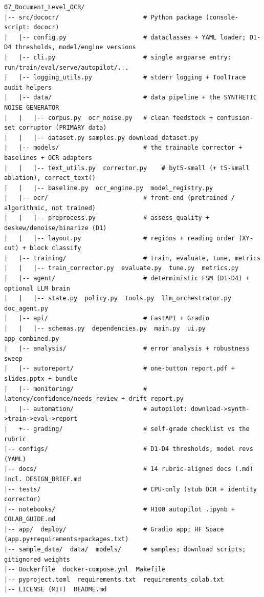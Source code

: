 \documentclass[12pt,a4paper]{article}
\begin{document}
\begin{lstlisting}[basicstyle=\ttfamily\footnotesize]
07_Document_Level_OCR/
|-- src/dococr/                       # Python package (console-script: dococr)
|   |-- config.py                     # dataclasses + YAML loader; D1-D4 thresholds, model/engine versions
|   |-- cli.py                        # single argparse entry: run/train/eval/serve/autopilot/...
|   |-- logging_utils.py              # stderr logging + ToolTrace audit helpers
|   |-- data/                         # data pipeline + the SYNTHETIC NOISE GENERATOR
|   |   |-- corpus.py  ocr_noise.py   # clean feedstock + confusion-set corruptor (PRIMARY data)
|   |   |-- dataset.py samples.py download_dataset.py
|   |-- models/                       # the trainable corrector + baselines + OCR adapters
|   |   |-- text_utils.py  corrector.py    # byt5-small (+ t5-small ablation), correct_text()
|   |   |-- baseline.py  ocr_engine.py  model_registry.py
|   |-- ocr/                          # front-end (pretrained / algorithmic, not trained)
|   |   |-- preprocess.py             # assess_quality + deskew/denoise/binarize (D1)
|   |   |-- layout.py                 # regions + reading order (XY-cut) + block classify
|   |-- training/                     # train, evaluate, tune, metrics
|   |   |-- train_corrector.py  evaluate.py  tune.py  metrics.py
|   |-- agent/                        # deterministic FSM (D1-D4) + optional LLM brain
|   |   |-- state.py  policy.py  tools.py  llm_orchestrator.py  doc_agent.py
|   |-- api/                          # FastAPI + Gradio
|   |   |-- schemas.py  dependencies.py  main.py  ui.py  app_combined.py
|   |-- analysis/                     # error analysis + robustness sweep
|   |-- autoreport/                   # one-button report.pdf + slides.pptx + bundle
|   |-- monitoring/                   # latency/confidence/needs_review + drift_report.py
|   |-- automation/                   # autopilot: download->synth->train->eval->report
|   +-- grading/                      # self-grade checklist vs the rubric
|-- configs/                          # D1-D4 thresholds, model revs (YAML)
|-- docs/                             # 14 rubric-aligned docs (.md) incl. DESIGN_BRIEF.md
|-- tests/                            # CPU-only (stub OCR + identity corrector)
|-- notebooks/                        # H100 autopilot .ipynb + COLAB_GUIDE.md
|-- app/  deploy/                     # Gradio app; HF Space (app.py+requirements+packages.txt)
|-- sample_data/  data/  models/      # samples; download scripts; gitignored weights
|-- Dockerfile  docker-compose.yml  Makefile
|-- pyproject.toml  requirements.txt  requirements_colab.txt
|-- LICENSE (MIT)  README.md
\end{lstlisting}
\end{document}
